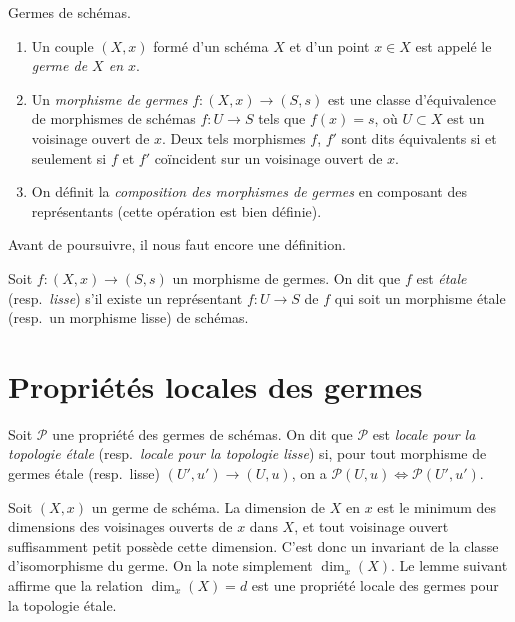 \begin{definition}
\label{definition-germs}
Germes de schémas.
\begin{enumerate}
\item Un couple $(X, x)$ formé d'un schéma $X$ et d'un point $x \in X$ est
appelé le {\it germe de $X$ en $x$}.
\item Un {\it morphisme de germes} $f : (X, x) \to (S, s)$ est une classe
d'équivalence de morphismes de schémas $f : U \to S$ tels que $f(x) = s$,
où $U \subset X$ est un voisinage ouvert de $x$. Deux tels morphismes
$f$, $f'$ sont dits équivalents si et seulement si $f$ et $f'$ coïncident
sur un voisinage ouvert de $x$.
\item On définit la {\it composition des morphismes de germes} en composant
des représentants (cette opération est bien définie).
\end{enumerate}
\end{definition}

\noindent
Avant de poursuivre, il nous faut encore une définition.

\begin{definition}
\label{definition-etale-morphism-germs}
Soit $f : (X, x) \to (S, s)$ un morphisme de germes. On dit que $f$ est
{\it \'etale} (resp.\ {\it lisse}) s'il existe un représentant
$f : U \to S$ de $f$ qui soit un morphisme \'etale (resp.\ un morphisme
lisse) de schémas.
\end{definition}








\section{Propriétés locales des germes}
\label{section-properties-germs-local}

\begin{definition}
\label{definition-local-at-point}
Soit $\mathcal{P}$ une propriété des germes de schémas. On dit que
$\mathcal{P}$ est {\it locale pour la topologie \'etale}
(resp.\ {\it locale pour la topologie lisse}) si, pour tout morphisme de
germes \'etale (resp.\ lisse) $(U', u') \to (U, u)$, on a
$\mathcal{P}(U, u) \Leftrightarrow \mathcal{P}(U', u')$.
\end{definition}

\noindent
Soit $(X, x)$ un germe de schéma. La dimension de $X$ en $x$ est le minimum
des dimensions des voisinages ouverts de $x$ dans $X$, et tout voisinage
ouvert suffisamment petit possède cette dimension. C'est donc un invariant
de la classe d'isomorphisme du germe. On la note simplement $\dim_x(X)$.
Le lemme suivant affirme que la relation $\dim_x(X) = d$ est une propriété
locale des germes pour la topologie \'etale.


